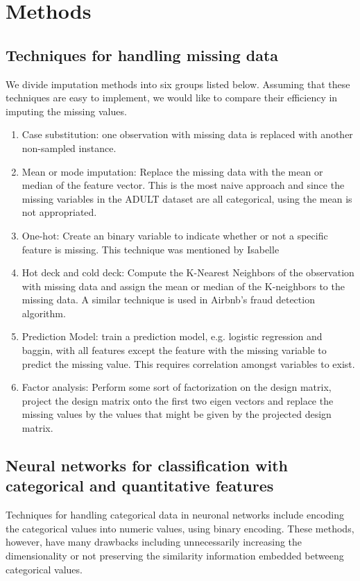 \documentclass[12pt]{article}
\begin{document}

\section{Methods}


\subsection{Techniques for handling missing data}
We divide imputation methods into six groups listed
below\cite{batista2003analysis}. Assuming that these techniques are easy to
implement, we would like to compare their efficiency in imputing the missing
values.

\begin{enumerate}
\item Case substitution: one observation with missing data is replaced with
    another non-sampled instance.
\item Mean or mode imputation: Replace the missing data with the mean or median of
    the feature vector. This is the most naive approach and since the missing
    variables in the ADULT dataset are all categorical, using the mean is not
    appropriated.
\item One-hot: Create an binary variable to indicate whether or not a specific
    feature is missing. This technique was mentioned by Isabelle
\item Hot deck and cold deck: Compute the K-Nearest Neighbors of the
    observation with missing data and assign the mean or median of the K-neighbors
    to the missing data. A similar technique is used in Airbnb's fraud detection
    algorithm.
\item Prediction Model: train a prediction model, e.g. logistic regression and
    baggin, with all features except the feature with the missing variable to
    predict the missing value. This requires correlation amongst variables to
    exist.
\item Factor analysis: Perform some sort of factorization on the design
    matrix, project the design matrix onto the first two eigen vectors and
    replace the missing values by the values that might be given by the
    projected design matrix.
\end{enumerate}

\subsection{Neural networks for classification with categorical and
quantitative features}  Techniques for handling categorical data in neuronal
networks include encoding the categorical values into numeric values, using
binary encoding. These methods, however, have many drawbacks including
unnecessarily increasing the dimensionality or not preserving the similarity
information embedded betweeng categorical values\cite{hsu2006generalizing}.
\end{document}
